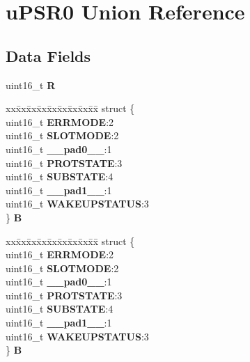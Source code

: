 \hypertarget{unionuPSR0}{}\section{u\+P\+S\+R0 Union Reference}
\label{unionuPSR0}
\subsection*{Data Fields}
\begin{DoxyCompactItemize}
\item 
\mbox{\label{unionuPSR0_a97ac4a7df651781013f2cfc2dbdf36ec}} 
uint16\+\_\+t {\bfseries R}
\item 
\mbox{\label{unionuPSR0_a29386019b4402f024fb515c706c5c222}} 
\begin{tabbing}
xx\=xx\=xx\=xx\=xx\=xx\=xx\=xx\=xx\=\kill
struct \{\\
\>uint16\_t {\bfseries ERRMODE}:2\\
\>uint16\_t {\bfseries SLOTMODE}:2\\
\>uint16\_t {\bfseries \_\_pad0\_\_}:1\\
\>uint16\_t {\bfseries PROTSTATE}:3\\
\>uint16\_t {\bfseries SUBSTATE}:4\\
\>uint16\_t {\bfseries \_\_pad1\_\_}:1\\
\>uint16\_t {\bfseries WAKEUPSTATUS}:3\\
\} {\bfseries B}\\

\end{tabbing}\item 
\mbox{\label{unionuPSR0_ac61ec4892fdbb6cc375ee89a1a4c387e}} 
\begin{tabbing}
xx\=xx\=xx\=xx\=xx\=xx\=xx\=xx\=xx\=\kill
struct \{\\
\>uint16\_t {\bfseries ERRMODE}:2\\
\>uint16\_t {\bfseries SLOTMODE}:2\\
\>uint16\_t {\bfseries \_\_pad0\_\_}:1\\
\>uint16\_t {\bfseries PROTSTATE}:3\\
\>uint16\_t {\bfseries SUBSTATE}:4\\
\>uint16\_t {\bfseries \_\_pad1\_\_}:1\\
\>uint16\_t {\bfseries WAKEUPSTATUS}:3\\
\} {\bfseries B}\\


\end{tabbing}
\end{DoxyCompactItemize}
